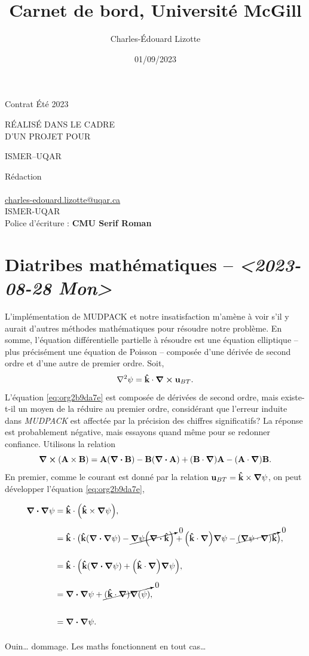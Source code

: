 \documentclass[10pt]{article}
\author{Charles-Édouard Lizotte}
\date{01/09/2023}
\title{Carnet de bord, Université McGill}
\makeatletter
\numberwithin{equation}{section}
\newcommand{\kvf}{\vb{\hat{k}}}
\newcommand{\uu}{\vb{u}}
\newcommand{\venti}{\vphantom{\sum_x^x}}
\newcommand{\mytitlepage}{
\begin{titlepage}
\begin{center}
{\Huge \thesubtitle \par}
\vspace{2cm}
{\Huge \MakeUppercase{\thetitle} \par}
\vspace{2cm}
RÉALISÉ DANS LE CADRE\\ D'UN PROJET POUR \par
\vspace{2cm}
{\Huge ISMER--UQAR \par}
\vspace{2cm}
{\thedate}
\end{center}
\vfill
Rédaction \\
{\theauthor}\\
\url{charles-edouard.lizotte@uqar.ca}\\
ISMER-UQAR\\
Police d'écriture : \textbf{CMU Serif Roman}
\end{titlepage}
}
\newcommand{\thesubtitle}{Contrat Été 2023}
\makeatother
\begin{document}
\mytitlepage
\tableofcontents\newpage

\section{Diatribes mathématiques -- \textit{<2023-08-28 Mon>}}
\label{sec:org4903a80}
L'implémentation de MUDPACK et notre insatisfaction m'amène à voir s'il y aurait d'autres méthodes mathématiques pour résoudre notre problème.
En somme, l'équation différentielle partielle à résoudre est une équation elliptique -- plus précisément une équation de Poisson -- composée d'une dérivée de second ordre et d'une autre de premier ordre.
Soit,
\begin{equation}
\label{eq:org2b9da7e}
   \laplacian{\psi} = \kvf \cdot \curl{\uu_{BT}}.
\end{equation}
L'équation \ref{eq:org2b9da7e} est composée de dérivées de second ordre, mais existe-t-il un moyen de la réduire au premier ordre, considérant que l'erreur induite dans \emph{MUDPACK} est affectée par la précision des chiffres significatifs?
La réponse est probablement négative, mais essayons quand même pour se redonner confiance.
Utilisons la relation
\begin{equation}
   \curl(\vb{A}\times\vb{B}) = \vb{A}\qty(\divergence{\vb{B}}) - \vb{B}\qty(\divergence{\vb{A}}) +\qty(\vb{B}\cdot\gradient)\vb{A} -\qty(\vb{A}\cdot\gradient)\vb{B}.
\end{equation}
En premier, comme le courant est donné par la relation \(\uu_{BT} = \kvf \times \gradient{\psi}\), on peut développer l'équation \ref{eq:org2b9da7e},
\begin{align}
   \div{\gradient{\psi}}
   \venti&= \kvf \cdot \qty(\kvf \times \gradient{\psi}),\nonumber \\
   \venti&= \kvf \cdot \big(\kvf\qty(\divergence{\gradient{\psi}}) - \cancelto{0}{\gradient{\psi}\qty(\divergence{\kvf})} + \qty(\kvf\cdot\gradient) \gradient{\psi} - \cancelto{0}{\qty(\gradient{\psi} \cdot\gradient)\kvf} \big),\nonumber\\
   \venti&= \kvf \cdot \qty(\kvf\qty(\divergence{\gradient{\psi}}) + \qty(\kvf\cdot\gradient) \gradient{\psi}),\nonumber\\
   \venti&= \divergence{\gradient{\psi}} + \cancelto{0}{(\kvf\cdot\gradient)\gradient(\psi)},\nonumber\\
   \venti&=\divergence{\gradient{\psi}}.
\end{align}
Ouin\ldots{} dommage. Les maths fonctionnent en tout cas\ldots{}
\end{document}
